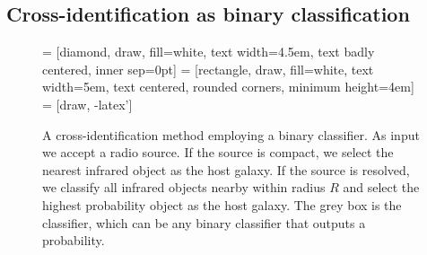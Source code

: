 \documentclass[fleqn,usenatbib,usedcolumn]{mnras}
\begin{document}
  \subsection{Cross-identification as binary
  classification}\label{cross-identification-as-binary-classification}
    \begin{figure}
      \centering
       = [diamond, draw, fill=white,
          text width=4.5em, text badly centered, inner sep=0pt]
       = [rectangle, draw, fill=white,
          text width=5em, text centered, rounded corners, minimum height=4em]
       = [draw, -latex']
      \caption{A cross-identification method employing a binary classifier. As
        input we accept a radio source. If the source is compact, we select
        the nearest infrared object as the host galaxy. If the source is
        resolved, we classify all infrared objects nearby within radius $R$
        and select the highest probability object as the host galaxy. The grey
        box is the classifier, which can be any binary classifier that outputs
        a probability.}
      \label{fig:flowchart}
    \end{figure}
        
\end{document}

